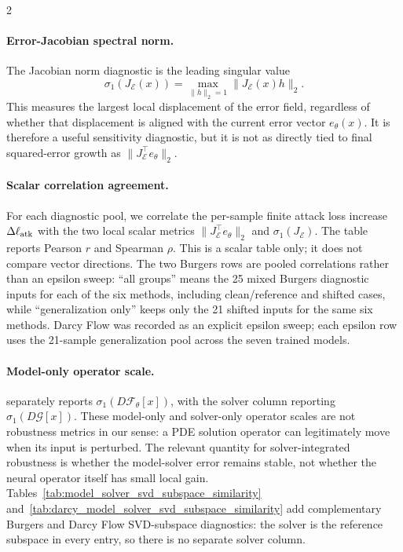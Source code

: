 \begin{multicols}{2}
\paragraph{Error-Jacobian spectral norm.}
The Jacobian norm diagnostic is the leading singular value
\[
  \sigma_1(J_{\mathcal E}(x))
  =
  \max_{\|h\|_2=1}\|J_{\mathcal E}(x)h\|_2 .
\]
This measures the largest local displacement of the error field, regardless of
whether that displacement is aligned with the current error vector
\(e_\theta(x)\).  It is therefore a useful sensitivity diagnostic, but it is not
as directly tied to final squared-error growth as
\(\|J_{\mathcal E}^{\top}e_\theta\|_2\).

\paragraph{Scalar correlation agreement.}
For each diagnostic pool, we correlate the per-sample finite attack loss
increase \(\Delta\ell_{\rm atk}\) with the two local scalar metrics
\(\|J_{\mathcal E}^{\top}e_\theta\|_2\) and
\(\sigma_1(J_{\mathcal E})\).  The table reports Pearson \(r\) and Spearman
\(\rho\).  This is a scalar table only; it does not compare vector directions.
The two Burgers rows are pooled correlations rather than an epsilon sweep:
``all groups'' means the 25 mixed Burgers diagnostic inputs for each of the six
methods, including clean/reference and shifted cases, while ``generalization
only'' keeps only the 21 shifted inputs for the same six methods.  Darcy Flow
was recorded as an explicit epsilon sweep; each epsilon row uses the 21-sample
generalization pool across the seven trained models.

\paragraph{Model-only operator scale.}
 separately reports
\(\sigma_1(D\mathcal{F}_\theta[x])\), with the solver column reporting
\(\sigma_1(D\mathcal{G}[x])\).  These model-only and solver-only operator
scales are not robustness metrics in our sense: a PDE solution operator can
legitimately move when its input is perturbed.  The relevant quantity for
solver-integrated robustness is whether the model-solver error remains stable,
not whether the neural operator itself has small local gain.
Tables~\ref{tab:model_solver_svd_subspace_similarity}
and~\ref{tab:darcy_model_solver_svd_subspace_similarity} add complementary
Burgers and Darcy Flow SVD-subspace diagnostics: the solver is the reference
subspace in every entry, so there is no separate solver column.

\end{multicols}

